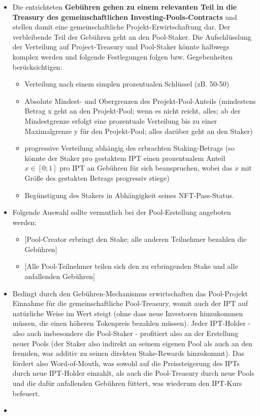 \begin{itemize}
\begin{itemize}
  	\item Die entrichteten \textbf{Gebühren gehen zu einem relevanten Teil in die Treasury des gemeinschaftlichen Investing-Pools-Contracts} und stellen damit eine gemeinschaftliche Projekt-Erwirtschaftung dar. Der verbleibende Teil der Gebühren geht an den Pool-Staker. Die Aufschlüsslung der Verteilung auf Project-Treasury und Pool-Staker könnte halbwegs komplex werden und folgende Festlegungen folgen bzw. Gegebenheiten berücksichtigen:
  	\begin{itemize}
  		\item Verteilung nach einem simplen prozentualen Schlüssel (zB. 50-50)
  		\item Absolute Mindest- und Obergrenzen des Projekt-Pool-Anteils (mindestens Betrag x geht an den Projekt-Pool; wenn es nicht reicht, alles; ab der Mindestgrenze erfolgt eine prozentuale Verteilung bis zu einer Maximalgrenze y für den Projekt-Pool; alles darüber geht an den Staker)
  		\item progressive Verteilung abhängig des erbrachten Staking-Betrags (so könnte der Staker pro gestaktem IPT einen prozentualem Anteil $x \in [0; 1]$ pro IPT an Gebühren für sich beanspruchen, wobei das $x$ mit Größe des gestakten Betrags progressiv stiege)
  		 \item Begünstigung des Stakers in Abhängigkeit seines NFT-Pass-Status.
  	\end{itemize}
  	\item Folgende Auswahl sollte vermutlich bei der Pool-Erstellung angeboten werden:
  	\begin{itemize}
  		\item $[$Pool-Creator erbringt den Stake; alle anderen Teilnehmer bezahlen die Gebühren$]$
  		\item $[$Alle Pool-Teilnehmer teilen sich den zu erbringenden Stake und alle anfallenden Gebühren$]$
  	\end{itemize} 
  	\item Bedingt durch den Gebühren-Mechanismus erwirtschaften das Pool-Projekt Einnahme für die gemeinschaftliche Pool-Treasury, womit auch der IPT auf natürliche Weise im Wert steigt (ohne dass neue Investoren hinzukommen müssen, die einen höheren Tokenpreis bezahlen müssen). Jeder IPT-Holder - also auch insbesondere die Pool-Staker - profitiert also an der Erstellung neuer Pools (der Staker also indirekt an seinem eigenen Pool als auch an den fremden, was additiv zu seinen direkten Stake-Rewards hinzukommt). Das fördert also Word-of-Mouth, was sowohl auf die Preissteigerung des IPTs durch neue IPT-Holder einzahlt, als auch die Pool-Treasury durch neue Pools und die dafür anfallenden Gebühren füttert, was wiederum den IPT-Kurs befeuert.
  	\item
  \end{itemize}
\end{itemize}

